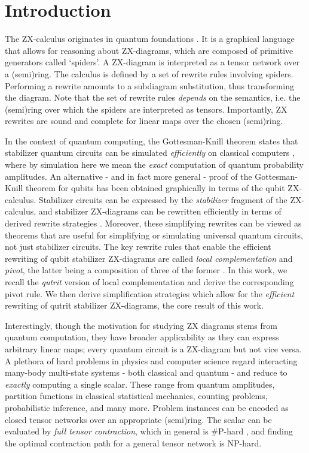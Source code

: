 \section{Introduction}



The ZX-calculus originates in
quantum foundations \cite{Coecke2011}.
It is a graphical language that allows for reasoning about ZX-diagrams, which are composed of primitive generators \cite{vandewetering2020zxcalculus} called `spiders'.
A ZX-diagram is interpreted as a tensor network over
a (semi)ring.
The calculus
is defined by a set of rewrite rules involving spiders. Performing a rewrite amounts to a
subdiagram substitution, thus transforming the diagram.
Note that the set of rewrite rules \emph{depends} on the semantics, i.e. the (semi)ring over which the spiders are interpreted as tensors.
Importantly, ZX rewrites are sound and complete for linear maps over the chosen (semi)ring.


In the context of quantum computing,
the Gottesman-Knill theorem states that stabilizer quantum
circuits can be
simulated \emph{efficiently} on classical computers \cite{Aaronson2004},
where by simulation here we mean the \emph{exact} computation of quantum probability amplitudes.
An alternative - and in fact more general - proof of the Gottesman-Knill theorem for qubits has been obtained graphically in terms of the qubit ZX-calculus.
Stabilizer circuits can be expressed by the \emph{stabilizer}
fragment of the ZX-calculus,
and stabilizer ZX-diagrams can be rewritten efficiently
in terms of derived rewrite strategies \cite{graph_theoretic_simplification}.
Moreover, these simplifying rewrites can be viewed as theorems
that are useful for simplifying or simulating universal quantum circuits, not just stabilizer circuits.
The key rewrite rules that enable the efficient rewriting
of qubit stabilizer ZX-diagrams
are called \emph{local complementation} and \emph{pivot},
the latter being a composition of three of the former \cite{graph_theoretic_simplification}.
In this work, we recall the \emph{qutrit} version of local complementation \cite{harny_completeness} and derive the corresponding pivot rule.
We then derive simplification strategies
which allow for the \emph{efficient} rewriting of qutrit stabilizer ZX-diagrams,
the core result of this work.



Interestingly, though the motivation for studying ZX diagrams stems from quantum computation, they have broader applicability as they
can express arbitrary linear maps;
every quantum circuit is a ZX-diagram but not vice versa.
A plethora of hard problems in physics and computer science
regard interacting many-body multi-state systems - both classical and quantum -
and reduce to \emph{exactly} computing a single scalar.
These range from quantum amplitudes,
partition functions in classical statistical mechanics,
counting problems, probabilistic inference, and many more.
Problem instances can be encoded as closed
tensor networks over an appropriate (semi)ring.
The scalar can be evaluated by \emph{full tensor contraction},
which in general is \#P-hard \cite{Damm2002},
and finding the optimal contraction path for a general tensor network is NP-hard.


